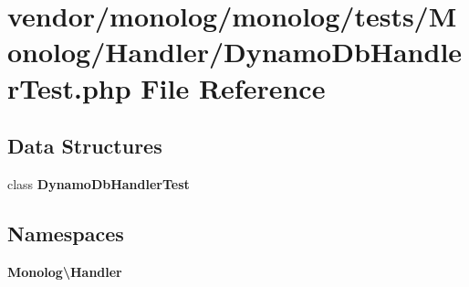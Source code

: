 \section{vendor/monolog/monolog/tests/\+Monolog/\+Handler/\+Dynamo\+Db\+Handler\+Test.php File Reference}
\label{_dynamo_db_handler_test_8php}
\subsection*{Data Structures}
\begin{DoxyCompactItemize}
\item 
class {\bf Dynamo\+Db\+Handler\+Test}
\end{DoxyCompactItemize}
\subsection*{Namespaces}
\begin{DoxyCompactItemize}
\item 
 {\bf Monolog\textbackslash{}\+Handler}
\end{DoxyCompactItemize}
